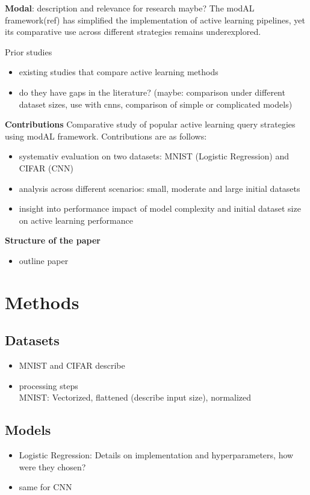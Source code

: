 \documentclass{article}
\theoremstyle{plain}
\theoremstyle{definition}
\theoremstyle{remark}
\begin{document}
\textbf{Modal}: description and relevance for research maybe? The modAL framework(ref) has simplified the implementation of active learning pipelines, yet its comparative use across different strategies remains underexplored.

Prior studies
\begin{itemize}
	\item existing studies that compare active learning methods
	\item do they have gaps in the literature? (maybe: comparison under different dataset sizes, use with cnns, comparison of simple or complicated models)
\end{itemize}

\textbf{Contributions}
Comparative study of popular active learning query strategies using modAL framework. Contributions are as follows:
\begin{itemize}
	\item systemativ evaluation on two datasets: MNIST (Logistic Regression) and CIFAR (CNN)
	\item analysis across different scenarios: small, moderate and large initial datasets
	\item insight into performance impact of model complexity and initial dataset size on active learning performance
\end{itemize}

\textbf{Structure of the paper}
\begin{itemize}
	\item outline paper
\end{itemize}

\section{Methods}\label{sec:methods}
\label{data_and_methods}
\subsection{Datasets}
\begin{itemize}
	\item MNIST and CIFAR describe
	\item processing steps \\
	MNIST: Vectorized, flattened (describe input size), normalized
\end{itemize}

\subsection{Models}
\begin{itemize}
	\item Logistic Regression: Details on implementation and hyperparameters, how were they chosen?
	\item same for CNN
\end{itemize}
\end{document}
